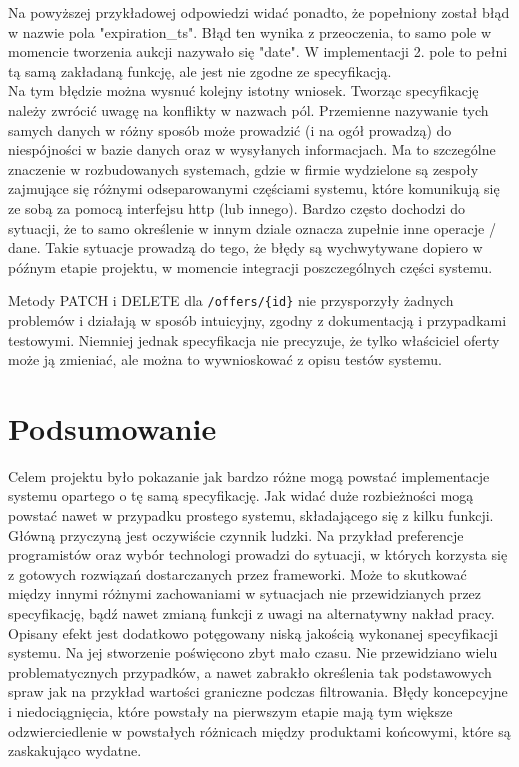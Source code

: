 \documentclass[12pt, notitlepage]{article}
\begin{document}
Na powyższej przykładowej odpowiedzi widać ponadto, że popełniony został błąd w nazwie pola "expiration\_ts". Błąd ten wynika z przeoczenia, to samo pole w momencie tworzenia aukcji nazywało się "date". W implementacji 2. pole to pełni tą samą zakładaną funkcję, ale jest nie zgodne ze specyfikacją. \\
Na tym błędzie można wysnuć kolejny istotny wniosek. Tworząc specyfikację należy zwrócić uwagę na konflikty w nazwach pól. Przemienne nazywanie tych samych danych w różny sposób może prowadzić (i na ogół prowadzą) do niespójności w bazie danych oraz w wysyłanych informacjach. Ma to szczególne znaczenie w rozbudowanych systemach, gdzie w firmie wydzielone są zespoły zajmujące się różnymi odseparowanymi częściami systemu, które komunikują się ze sobą za pomocą interfejsu http (lub innego). Bardzo często dochodzi do sytuacji, że to samo określenie w innym dziale oznacza zupełnie inne operacje / dane. Takie sytuacje prowadzą do tego, że błędy są wychwytywane dopiero w późnym etapie projektu, w momencie integracji poszczególnych części systemu.

Metody PATCH i DELETE dla \texttt{/offers/\{id\}} nie przysporzyły żadnych problemów i działają w sposób intuicyjny, zgodny z dokumentacją i przypadkami testowymi. Niemniej jednak specyfikacja nie precyzuje, że tylko właściciel oferty może ją zmieniać, ale można to wywnioskować z opisu testów systemu.

\section{Podsumowanie}

Celem projektu było pokazanie jak bardzo różne mogą powstać implementacje systemu opartego o tę samą specyfikację. Jak widać duże rozbieżności mogą powstać nawet w przypadku prostego systemu, składającego się z kilku funkcji. Główną przyczyną jest oczywiście czynnik ludzki. Na przykład preferencje programistów oraz wybór technologi prowadzi do sytuacji, w których korzysta się z gotowych rozwiązań dostarczanych przez frameworki. Może to skutkować między innymi różnymi zachowaniami w sytuacjach nie przewidzianych przez specyfikację, bądź nawet zmianą funkcji z uwagi na alternatywny nakład pracy. Opisany efekt jest dodatkowo potęgowany niską jakością wykonanej specyfikacji systemu. Na jej stworzenie poświęcono zbyt mało czasu. Nie przewidziano wielu problematycznych przypadków, a nawet zabrakło określenia tak podstawowych spraw jak na przykład wartości graniczne podczas filtrowania. Błędy koncepcyjne i niedociągnięcia, które powstały na pierwszym etapie mają tym większe odzwierciedlenie w powstałych różnicach między produktami końcowymi, które są zaskakująco wydatne.
\end{document}
